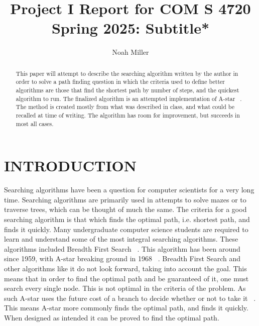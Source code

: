 \documentclass[letterpaper, 10 pt, conference]{ieeeconf}   %
\title{\LARGE \bf
Project I Report for COM S 4720 Spring 2025: Subtitle*
}
\author{Noah Miller}
\begin{document}
\maketitle
\thispagestyle{empty}
\pagestyle{empty}


\begin{abstract}
	This paper will attempt to describe the searching algorithm written by the author in order to solve a path finding question in which the criteria used to define better algorithms are those that find the shortest path by number of steps, and the quickest algorithm to run.
	The finalized algorithm is an attempted implementation of A-star ~\cite{hart1968formal}. The method is created mostly from what was described in class, and what could be recalled at time of writing. The algorithm has room for improvement, but succeeds in most all cases.
\end{abstract}


%
%
%
\section{INTRODUCTION}

Searching algorithms have been a question for computer scientists for a very long time. Searching algorithms are primarily used in attempts to solve mazes or to traverse trees, which can be thought of much the same. The criteria for a good searching algorithm is that which finds the optimal path, i.e. shortest path, and finds it quickly. Many undergraduate computer science students are required to learn and understand some of the most integral searching algorithms. These algorithms included Breadth First Search ~\cite{moore1959shortest}. This algorithm has been around since 1959, with A-star breaking ground in 1968 ~\cite{hart1968formal}. Breadth First Search and other algorithms like it do not look forward, taking into account the goal. This means that in order to find the optimal path and be guaranteed of it, one must search every single node. This is not optimal in the criteria of the problem. As such A-star uses the future cost of a branch to decide whether or not to take it ~\cite{hart1968formal}. This means A-star more commonly finds the optimal path, and finds it quickly. When designed as intended it can be proved to find the optimal path.
\end{document}
